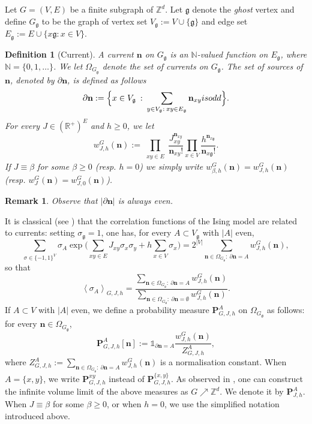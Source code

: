 \documentclass[10pt,a4paper]{amsart}
\numberwithin{equation}{section}
\newtheorem{Def}[Thm]{Definition}
\newtheorem{Rem}[Thm]{Remark}
\newcommand\n{\mathbf{n}}
\newcommand\sn{\partial\mathbf{n}}
\newcommand\fg{\mathfrak{g}}
\begin{document}
Let $G=(V,E)$ be a finite subgraph of $\mathbb Z^d$. Let $\mathfrak{g}$ denote the \emph{ghost} vertex and define $G_{\mathfrak{g}}$ to be the graph of vertex set $V_\mathfrak{g}:=V\cup \{\mathfrak{g}\}$ and edge set $E_{\mathfrak{g}}:=E\cup \{x\mathfrak{g}: x\in V\}$.
\begin{Def}[Current] A \textit{current} $\n$ on $G_\fg$ is an $\mathbb N$-valued function on $E_\fg$, where $\mathbb N=\lbrace 0,1,\ldots\rbrace$. We let $\Omega_{G_\fg}$ denote the set of currents on $G_\fg$. The set of \emph{sources} of $\n$, denoted by $\sn$, is defined as follows
\begin{equation}
\sn:=\Big\{ x \in V_\fg \: : \: \sum_{y\in V_\fg:\: xy\in E_\fg}\n_{xy}\textup{ is odd}\Big\}.
\end{equation}
For every $J\in (\mathbb R^+)^E$ and $h\geq 0$, we let
\begin{equation}
w_{J,h}^G(\n):=\prod_{\substack{xy\in E}}\dfrac{J_{xy}^{\n_{xy}}}{\n_{xy}!}\prod_{x\in V}\frac{h^{\n_{x\fg}}}{\n_{x\fg}!}.
\end{equation}
If $J\equiv \beta$ for some $\beta\geq 0$ (resp. $h=0$) we simply write $w_{\beta,h}^G(\n)=w_{J,h}^G(\n)$ (resp. $w_{J}^G(\n)=w_{J,0}^G(\n)$). 
\end{Def}
\begin{Rem} Observe that $|\sn|$ is always even.
\end{Rem}

It is classical (see \cite{AizenmanGeometricAnalysis1982,DuminilLecturesOnIsingandPottsModels2019,Panis2024applications}) that the correlation functions of the Ising model are related to currents: setting $\sigma_{\fg}=1$, one has, for every $A\subset V_\fg$ with $|A|$ even, 
\begin{equation}\label{eq: relation partition functions}
	\sum_{\sigma\in \{-1,1\}^V}\sigma_A \exp\Big(\sum_{xy\in E}J_{xy}\sigma_x\sigma_y+h\sum_{x\in V}\sigma_x\Big)=2^{|V|}\sum_{\n\in \Omega_{G_\fg}:\: \sn=A}w^G_{J,h}(\n),
\end{equation}
so that
\begin{equation}\label{equation correlation rcr}
\left\langle \sigma_A\right\rangle_{G,J,h}=\dfrac{\sum_{\n\in \Omega_{G_\fg}:\:\sn=A}w_{J,h}^G(\n)}{\sum_{\n\in \Omega_{G_\fg}:\:\sn=\emptyset}w_{J,h}^G(\n)}. 
\end{equation}
If $A\subset V$ with $|A|$ even, we define a probability measure $\mathbf{P}_{G,J,h}^A$ on $\Omega_{G_\fg}$ as follows: for every $\n\in \Omega_{G_\fg}$, 
\begin{equation}
    \mathbf{P}_{G,J,h}^A[\n]:=\mathds{1}_{\sn=A}\frac{w_{J,h}^G(\n)}{Z_{G,J,h}^A},
\end{equation}
where $Z_{G,J,h}^A:=\sum_{\n\in \Omega_{G_\fg}:\:\sn=A}w_{J,h}^G(\n)$ is a normalisation constant. When $A=\lbrace x,y\rbrace$, we write $\mathbf{P}^{xy}_{G,J,h}$ instead of $\mathbf{P}^{\{x,y\}}_{G,J,h}$. As observed in \cite{AizenmanDuminilSidoraviciusContinuityIsing2015}, one can construct the infinite volume limit of the above measures as $G\nearrow \mathbb Z^d$. We denote it by $\mathbf P_{J,h}^A$. When $J\equiv\beta$ for some $\beta\geq 0$, or when $h=0$, we use the simplified notation introduced above.
\end{document}
